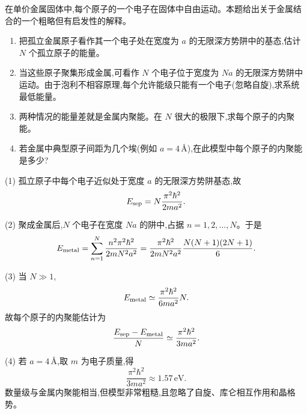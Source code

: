 \begin{question}
在单价金属固体中,每个原子的一个电子在固体中自由运动。本题给出关于金属结合的一个粗略但有启发性的解释。
\begin{enumerate}
\item 把孤立金属原子看作其一个电子处在宽度为 $a$ 的无限深方势阱中的基态,估计 $N$ 个孤立原子的能量。
\item 当这些原子聚集形成金属,可看作 $N$ 个电子位于宽度为 $Na$ 的无限深方势阱中运动。由于泡利不相容原理,每个允许能级只能有一个电子(忽略自旋),求系统最低能量。
\item 两种情况的能量差就是金属内聚能。在 $N$ 很大的极限下,求每个原子的内聚能。
\item 若金属中典型原子间距为几个埃(例如 $a=4\,\text{\AA}$),在此模型中每个原子的内聚能是多少?
\end{enumerate}
\end{question}
\begin{solution}
(1) 孤立原子中每个电子近似处于宽度 $a$ 的无限深方势阱基态,故
\[
E_{\rm sep}=N\frac{\pi^2\hbar^2}{2ma^2}.
\]

(2) 聚成金属后,$N$ 个电子在宽度 $Na$ 的阱中,占据 $n=1,2,\ldots,N$。于是
\[
E_{\rm metal}=\sum_{n=1}^N\frac{n^2\pi^2\hbar^2}{2mN^2a^2}
=\frac{\pi^2\hbar^2}{2mN^2a^2}\frac{N(N+1)(2N+1)}6.
\]

(3) 当 $N\gg1$,
\[
E_{\rm metal}\simeq \frac{\pi^2\hbar^2}{6ma^2}N.
\]
故每个原子的内聚能估计为
\[
\frac{E_{\rm sep}-E_{\rm metal}}{N}
\simeq \frac{\pi^2\hbar^2}{3ma^2}.
\]

(4) 若 $a=4\,\text{\AA}$,取 $m$ 为电子质量,得
\[
\frac{\pi^2\hbar^2}{3ma^2}\approx 1.57\,\mathrm{eV}.
\]
数量级与金属内聚能相当,但模型非常粗糙,且忽略了自旋、库仑相互作用和晶格势。
\end{solution}

